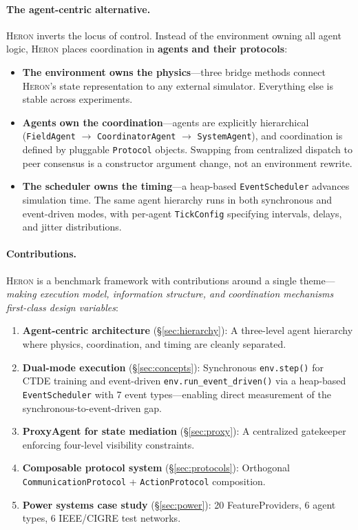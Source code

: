 \documentclass{article}
\newcommand{\heron}{\textsc{Heron}}
\begin{document}
\paragraph{The agent-centric alternative.}
\heron{} inverts the locus of control. Instead of the environment owning all agent logic, \heron{} places coordination in \textbf{agents and their protocols}:
\begin{itemize}[nosep]
    \item \textbf{The environment owns the physics}---three bridge methods connect \heron{}'s state representation to any external simulator. Everything else is stable across experiments.
    \item \textbf{Agents own the coordination}---agents are explicitly hierarchical (\texttt{FieldAgent} $\rightarrow$ \texttt{CoordinatorAgent} $\rightarrow$ \texttt{SystemAgent}), and coordination is defined by pluggable \texttt{Protocol} objects. Swapping from centralized dispatch to peer consensus is a constructor argument change, not an environment rewrite.
    \item \textbf{The scheduler owns the timing}---a heap-based \texttt{EventScheduler} advances simulation time. The same agent hierarchy runs in both synchronous and event-driven modes, with per-agent \texttt{TickConfig} specifying intervals, delays, and jitter distributions.
\end{itemize}

\paragraph{Contributions.}
\heron{} is a benchmark framework with contributions around a single theme---\emph{making execution model, information structure, and coordination mechanisms first-class design variables}:
\begin{enumerate}[leftmargin=*, itemsep=2pt]
    \item \textbf{Agent-centric architecture} (\S\ref{sec:hierarchy}): A three-level agent hierarchy where physics, coordination, and timing are cleanly separated.
    \item \textbf{Dual-mode execution} (\S\ref{sec:concepts}): Synchronous \texttt{env.step()} for CTDE training and event-driven \texttt{env.run\_event\_driven()} via a heap-based \texttt{EventScheduler} with 7 event types---enabling direct measurement of the synchronous-to-event-driven gap.
    \item \textbf{ProxyAgent for state mediation} (\S\ref{sec:proxy}): A centralized gatekeeper enforcing four-level visibility constraints.
    \item \textbf{Composable protocol system} (\S\ref{sec:protocols}): Orthogonal \texttt{CommunicationProtocol} + \texttt{ActionProtocol} composition.
    \item \textbf{Power systems case study} (\S\ref{sec:power}): 20 FeatureProviders, 6 agent types, 6 IEEE/CIGRE test networks.
\end{enumerate}
\end{document}
